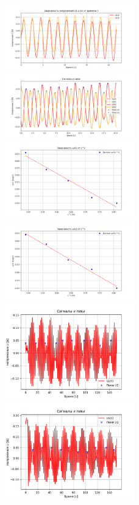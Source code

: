 \documentclass[a4paper]{article}
\begin{document}
\begin{figure}[H]
\includegraphics[width=0.5\textwidth]{gra_1}
\includegraphics[width=0.5\textwidth]{gra_2}
\includegraphics[width=0.5\textwidth]{gra_3}
\includegraphics[width=0.5\textwidth]{gra_4}
\includegraphics[width=0.5\textwidth]{gra_5}
\includegraphics[width=0.5\textwidth]{gra_6}
\end{figure}
\end{document}
